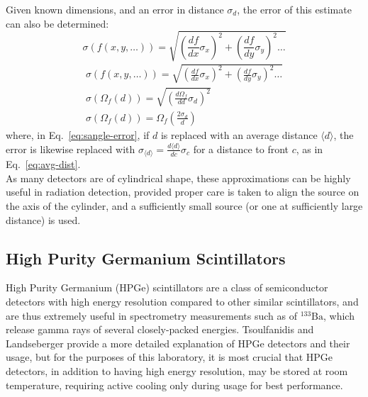 \documentclass[12pt]{article}
\newcommand{\BaSrc}{$\mathrm{^{133}Ba}$\xspace}
\begin{document}
Given known dimensions, and an error in distance $\sigma_d$, the error of this estimate can also be determined:
\begin{equation}
    \label{eq:gen-err-prop}
    \sigma(f(x,y,\dots))=\sqrt{(\frac{df}{dx} \sigma_x)^2 + (\frac{df}{dy} \sigma_y)^2 \dots}
\end{equation}
\begin{equation}
    \label{eq:sangle-error}
    \begin{gathered}
        \sigma(f(x,y,\dots))=\sqrt{(\frac{df}{dx} \sigma_x)^2 + (\frac{df}{dy} \sigma_y)^2 \dots} \\
        \sigma(\Omega_f(d))=\sqrt{(\frac{d\Omega_f}{dd} \sigma_d)^2}\\
        \sigma(\Omega_f(d))=\Omega_f\left(\frac{2\sigma_d}{d}\right)
    \end{gathered}
\end{equation}
\newcommand{\avd}{\langle d\rangle}
where, in Eq.~\ref{eq:sangle-error}, if $d$ is replaced with an average distance $\avd$, the error is likewise replaced with $\sigma_{\avd}=\frac{d\avd}{dc}\sigma_c$ for a distance to front $c$, as in Eq.~\ref{eq:avg-dist}.\\

As many detectors are of cylindrical shape\cite{knoll_radiation_2010}, these approximations can be highly useful in radiation detection, provided proper care is taken to align the source on the axis of the cylinder, and a sufficiently small source (or one at sufficiently large distance) is used.

\subsection{High Purity Germanium Scintillators}
High Purity Germanium (HPGe) scintillators are a class of semiconductor detectors with high energy resolution compared to other similar scintillators, and are thus extremely useful in spectrometry measurements such as of \BaSrc, which release gamma rays of several closely-packed energies.
Tsoulfanidis and Landseberger provide a more detailed explanation of HPGe detectors and their usage\cite{tsoulfanidis_measurement_2015}, but for the purposes of this laboratory, it is most crucial that HPGe detectors, in addition to having high energy resolution, may be stored at room temperature, requiring active cooling only during usage for best performance.
\end{document}

